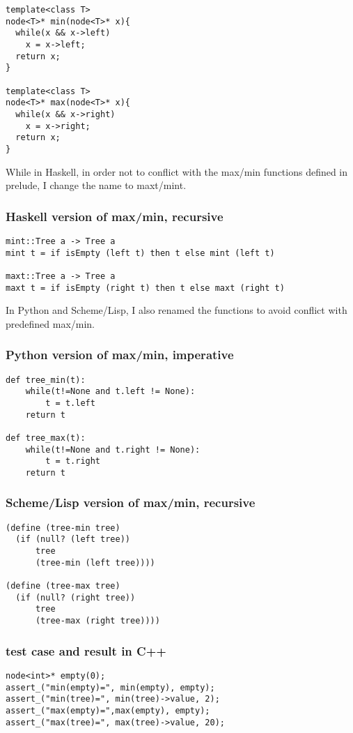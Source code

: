 \documentclass{article}
\begin{document}
\lstset{language=c++}
\begin{lstlisting}
template<class T>
node<T>* min(node<T>* x){
  while(x && x->left)
    x = x->left;
  return x;
}

template<class T>
node<T>* max(node<T>* x){
  while(x && x->right)
    x = x->right;
  return x;
}
\end{lstlisting}

While in Haskell, in order not to conflict with the max/min functions 
defined in prelude, I change the name to maxt/mint.

\subsubsection*{Haskell version of max/min, recursive}
\lstset{language=Haskell}
\begin{lstlisting}
mint::Tree a -> Tree a
mint t = if isEmpty (left t) then t else mint (left t)

maxt::Tree a -> Tree a
maxt t = if isEmpty (right t) then t else maxt (right t)
\end{lstlisting}

In Python and Scheme/Lisp, I also renamed the functions to avoid
conflict with predefined max/min.

\subsubsection*{Python version of max/min, imperative}
\lstset{language=Python}
\begin{lstlisting}
def tree_min(t):
    while(t!=None and t.left != None):
        t = t.left
    return t

def tree_max(t):
    while(t!=None and t.right != None):
        t = t.right
    return t
\end{lstlisting}

\subsubsection*{Scheme/Lisp version of max/min, recursive}
\lstset{language=lisp}
\begin{lstlisting}
(define (tree-min tree)
  (if (null? (left tree))
      tree
      (tree-min (left tree))))

(define (tree-max tree)
  (if (null? (right tree))
      tree
      (tree-max (right tree))))
\end{lstlisting}

\subsubsection*{test case and result in C++}
\lstset{language=c++}
\begin{lstlisting}
node<int>* empty(0);
assert_("min(empty)=", min(empty), empty);
assert_("min(tree)=", min(tree)->value, 2);
assert_("max(empty)=",max(empty), empty);
assert_("max(tree)=", max(tree)->value, 20);
\end{lstlisting}
\end{document}
